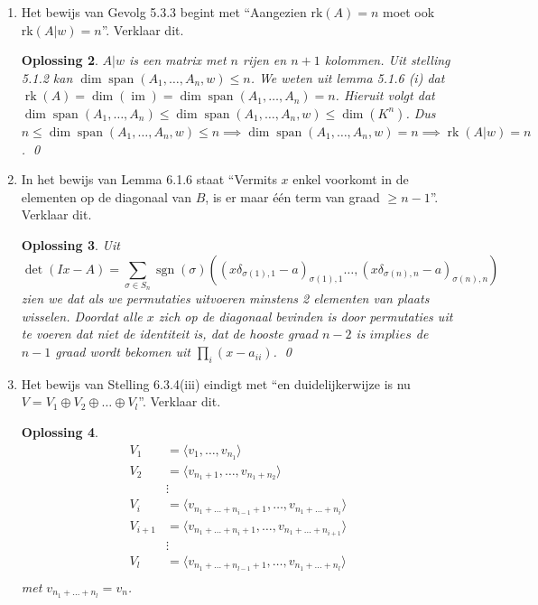 \documentclass[a4paper,12pt]{article}
\newtheorem{oplossing}{Oplossing}
\begin{document}
\begin{enumerate}
\begin{oplossing}
        Inverteerbaarheid volgt door hetzelfde te doen maar met \(\mathcal{B} \to \mathcal{B}'\) en \(\mathcal{B}' \to \mathcal{B}\).
        \qed
    \end{oplossing} 
    \item[(iv)] Het bewijs van Gevolg 5.3.3 begint met ``Aangezien $\text{rk}(A)=n$ moet ook $\text{rk}(A|w)=n$''. Verklaar dit.
    \begin{oplossing}
        \(A|w\) is een matrix met \(n\) rijen en \(n+1\) kolommen. Uit stelling 5.1.2 kan \(\dim\operatorname{span}(A_1, \dots ,A_n,w ) \leq n\).
        We weten uit lemma 5.1.6 (i) dat \(\operatorname{rk}(A) = \dim(\operatorname{im}) = \dim\operatorname{span}(A_1, \dots ,A_n ) = n \).
        Hieruit volgt dat \(\dim \operatorname{span}(A_1, \dots ,A_n ) \le \dim\operatorname{span}(A_1, \dots ,A_n,w ) \le \dim(K^n) \).
        Dus \(n \le \dim\operatorname{span}(A_1, \dots ,A_n,w ) \le n \implies \dim \operatorname{span}(A_1, \dots ,A_n,w ) = n \implies \operatorname{rk}(A|w) = n\).
        \qed
    \end{oplossing}
    \item[(v)] In het bewijs van Lemma 6.1.6 staat ``Vermits $x$ enkel voorkomt in de elementen op de diagonaal van $B$, is er maar één term van graad $\geq n-1$''. Verklaar dit.
    \begin{oplossing}
        Uit 
        \[\det (Ix-A) = \sum_{\sigma \in S_n} \operatorname{sgn} (\sigma)((x\delta_{\sigma (1),1}-a)_{\sigma (1),1 }\dots , (x\delta_{\sigma (n),n}-a)_{\sigma (n),n})\]
        zien we dat als we permutaties uitvoeren minstens 2 elementen van plaats wisselen.
        Doordat alle \(x\) zich op de diagonaal bevinden is door permutaties uit te voeren dat niet de identiteit is,
        dat de hooste graad \(n-2\) is \(implies\) de \(n-1\) graad wordt bekomen uit  \(\prod_i (x-a_{ii})\).
        \qed
    \end{oplossing}
    \item[(vi)] Het bewijs van Stelling 6.3.4(iii) eindigt met ``en duidelijkerwijze is nu $V=V_{1}\oplus V_{2}\oplus \dots \oplus V_{l}$''. Verklaar dit.
    \begin{oplossing}
        \begin{align*}
            V_1 &= \langle v_1 , \dots, v_{n_1}\rangle \\
            V_2 &= \langle v_{n_1 + 1} , \dots, v_{n_1 + n_2}\rangle \\
            &\vdots \\
            V_i &= \langle v_{n_1 + \dots + n_{i-1} +1} , \dots, v_{n_1 + \dots + n_i}\rangle \\
            V_{i+1} &= \langle v_{n_1 + \dots + n_{i} +1} , \dots, v_{n_1 + \dots + n_{i+1}}\rangle \\
            &\vdots \\
            V_{l} &= \langle v_{n_1 + \dots + n_{l-1} + 1} , \dots, v_{n_1 + \dots + n_{l}}\rangle \\
        \end{align*}
        met \(v_{n_1 + \dots + n_{l}} = v_n\).


\end{oplossing}
\end{enumerate}
\end{document}
